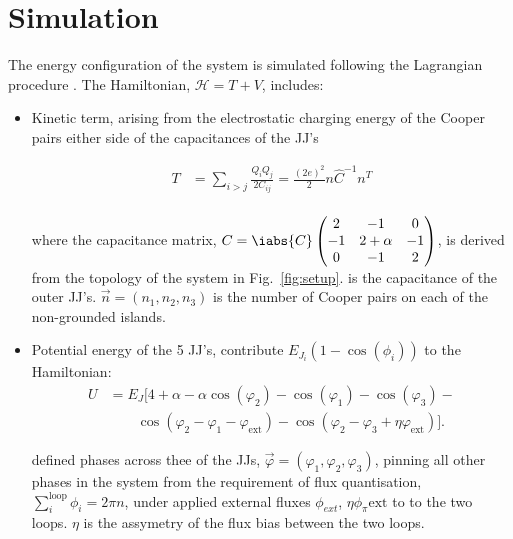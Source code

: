 \section{Simulation}

 \noindent The energy configuration of the system is simulated following the Lagrangian procedure \cite{twin_flux_qubit}. The Hamiltonian, $ \mathcal{H} = T + V $, includes:
 \begin{itemize}
 	
 	\item Kinetic term, arising from the electrostatic charging energy of the Cooper pairs either side of the capacitances of the JJ's 
 	
 	\begin{equation}\label{key}
 		 \begin{aligned}
 		 T & = \sum_{i>j}\frac{Q_iQ_j}{2C_{ij}} = \frac{(2e)^2}{2}n\hat{C}^{-1}n^{T}\\
 		 \end{aligned}
 	\end{equation}
 	
 	\noindent where the capacitance matrix, $ C = \iabs{C}\begin{pmatrix} 2 & -1 & 0\\ -1 & 2 + \alpha & -1\\ 0 & -1 & 2	\end{pmatrix} $, is derived from the topology of the system in Fig.~\ref{fig:setup}.  is the capacitance of the outer JJ's. $ \vec{n} = (n_1, n_2, n_3) $ is the number of Cooper pairs on each of the non-grounded islands.
 	
 	\item Potential energy of the 5 JJ's, contribute $ E_{J_i}(1-\cos(\phi_i)) $ to the Hamiltonian:
 	\begin{equation}\label{key}
 		\begin{aligned}
 		U & = E_J\big[4 + \alpha - \alpha\cos(\varphi_{2}) -\cos(\varphi_{1}) -\cos(\varphi_{3}) - \\ & \qquad \cos(\varphi_{2} - \varphi_{1} - \varphi_{\text{ext}}) - \cos(\varphi_{2} - \varphi_{3} + \eta\varphi_{\text{ext}})\big].
 		\end{aligned}	
 	\end{equation}
 	
 	\noindent  defined phases across thee of the JJs, $ \vec{\varphi} = (\varphi_1, \varphi_2, \varphi_3) $, pinning all other phases in the system from the requirement of flux quantisation, $ \sum_i^{\text{loop}} \phi_i = 2\pi n $, under applied external fluxes $ \phi_{ext} $, $ \eta\phi_\pi\text{ext} $ to to the two loops. $ \eta $ is the assymetry of the flux bias between the two loops.
 \end{itemize}
 
